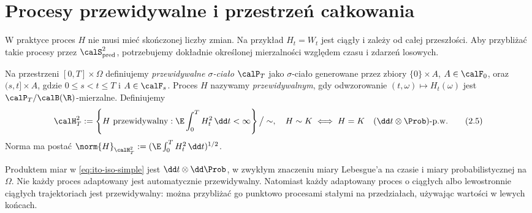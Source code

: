 \section{Procesy przewidywalne i przestrzeń całkowania}
W praktyce proces $H$ nie musi mieć skończonej liczby zmian.
Na przykład $H_t=W_t$ jest ciągły i zależy od całej
przeszłości. Aby przybliżać takie procesy przez
$\calS_{\mathrm{pred}}^2$, potrzebujemy dokładnie określonej
mierzalności względem czasu i zdarzeń losowych.

\begin{definicja}
Na przestrzeni $[0,T]\times\Omega$ definiujemy
\emph{przewidywalne $\sigma$-ciało} $\calP_T$ jako
$\sigma$-ciało generowane przez zbiory
$\{0\}\times A$, $A\in\calF_0$, oraz
$(s,t]\times A$, gdzie $0\le s<t\le T$ i $A\in\calF_s$.
Proces $H$ nazywamy \emph{przewidywalnym}, gdy odwzorowanie
$(t,\omega)\mapsto H_t(\omega)$ jest
$\calP_T/\calB(\R)$-mierzalne.
Definiujemy
\[
\calH_T^2:=\left\{H\text{ przewidywalny}:
\E\int_0^T H_t^2\,\dd t<\infty\right\}\big/\sim,
\quad H\sim K\iff H=K\quad
(\dd t\otimes\Prob)\text{-p.w.}
\tag{2.5}
\]
Norma ma postać
$\norm{H}_{\calH_T^2}:=(\E\int_0^TH_t^2\,\dd t)^{1/2}$.
\end{definicja}

\begin{uwaga}
Produktem miar w \eqref{eq:ito-iso-simple} jest
$\dd t\otimes\dd\Prob$, w zwykłym znaczeniu miary
Lebesgue'a na czasie i miary probabilistycznej na $\Omega$.
Nie każdy proces adaptowany jest automatycznie przewidywalny.
Natomiast każdy adaptowany proces o ciągłych albo
lewostronnie ciągłych trajektoriach jest przewidywalny:
można przybliżać go punktowo procesami stałymi na
przedziałach, używając wartości w lewych końcach.
\end{uwaga}

